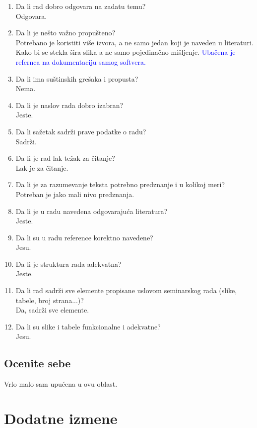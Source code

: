 \documentclass[a4paper]{report}
\newcommand{\odgovor}[1]{\textcolor{blue}{#1}}
\begin{document}
\begin{enumerate}
\item Da li rad dobro odgovara na zadatu temu?\\ Odgovara.
\item Da li je nešto važno propušteno?\\ Potrebano je koristiti više izvora, a ne samo jedan koji je naveden u literaturi. Kako bi se stekla šira slika a ne samo pojedinačno mišljenje. 
\odgovor{Ubačena je refernca na dokumentaciju samog softvera.}
\item Da li ima suštinskih grešaka i propusta?\\ Nema.
\item Da li je naslov rada dobro izabran?\\ Jeste. 
\item Da li sažetak sadrži prave podatke o radu?\\ Sadrži.
\item Da li je rad lak-težak za čitanje?\\ Lak je za čitanje.
\item Da li je za razumevanje teksta potrebno predznanje i u kolikoj meri?\\ Potreban je jako mali nivo predznanja.
\item Da li je u radu navedena odgovarajuća literatura?\\ Jeste. 
\item Da li su u radu reference korektno navedene?\\ Jesu.
\item Da li je struktura rada adekvatna?\\ Jeste. 
\item Da li rad sadrži sve elemente propisane uslovom seminarskog rada (slike, tabele, broj strana...)?\\ Da, sadrži sve elemente.
\item Da li su slike i tabele funkcionalne i adekvatne?\\ Jesu.
\end{enumerate}

\section{Ocenite sebe}
Vrlo malo sam upućena u ovu oblast. 

\chapter{Dodatne izmene}
\end{document}
